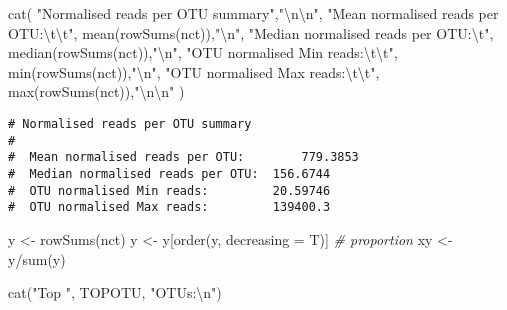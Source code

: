\documentclass[
]{article}
\newenvironment{Shaded}{\begin{snugshade}}{\end{snugshade}}
\newcommand{\AttributeTok}[1]{\textcolor[rgb]{0.77,0.63,0.00}{#1}}
\newcommand{\CommentTok}[1]{\textcolor[rgb]{0.56,0.35,0.01}{\textit{#1}}}
\newcommand{\FunctionTok}[1]{\textcolor[rgb]{0.00,0.00,0.00}{#1}}
\newcommand{\NormalTok}[1]{#1}
\newcommand{\OtherTok}[1]{\textcolor[rgb]{0.56,0.35,0.01}{#1}}
\newcommand{\SpecialCharTok}[1]{\textcolor[rgb]{0.00,0.00,0.00}{#1}}
\newcommand{\StringTok}[1]{\textcolor[rgb]{0.31,0.60,0.02}{#1}}
\begin{document}
\begin{Shaded}
\begin{Highlighting}[]
\FunctionTok{cat}\NormalTok{(}
  \StringTok{"Normalised reads per OTU summary"}\NormalTok{,}\StringTok{"}\SpecialCharTok{\textbackslash{}n\textbackslash{}n}\StringTok{"}\NormalTok{,}
  \StringTok{"Mean normalised reads per OTU:}\SpecialCharTok{\textbackslash{}t\textbackslash{}t}\StringTok{"}\NormalTok{, }\FunctionTok{mean}\NormalTok{(}\FunctionTok{rowSums}\NormalTok{(nct)),}\StringTok{"}\SpecialCharTok{\textbackslash{}n}\StringTok{"}\NormalTok{,}
  \StringTok{"Median normalised reads per OTU:}\SpecialCharTok{\textbackslash{}t}\StringTok{"}\NormalTok{, }\FunctionTok{median}\NormalTok{(}\FunctionTok{rowSums}\NormalTok{(nct)),}\StringTok{"}\SpecialCharTok{\textbackslash{}n}\StringTok{"}\NormalTok{,}
  \StringTok{"OTU normalised Min reads:}\SpecialCharTok{\textbackslash{}t\textbackslash{}t}\StringTok{"}\NormalTok{, }\FunctionTok{min}\NormalTok{(}\FunctionTok{rowSums}\NormalTok{(nct)),}\StringTok{"}\SpecialCharTok{\textbackslash{}n}\StringTok{"}\NormalTok{,}
  \StringTok{"OTU normalised Max reads:}\SpecialCharTok{\textbackslash{}t\textbackslash{}t}\StringTok{"}\NormalTok{, }\FunctionTok{max}\NormalTok{(}\FunctionTok{rowSums}\NormalTok{(nct)),}\StringTok{"}\SpecialCharTok{\textbackslash{}n\textbackslash{}n}\StringTok{"}
\NormalTok{)}
\end{Highlighting}
\end{Shaded}

\begin{verbatim}
# Normalised reads per OTU summary 
# 
#  Mean normalised reads per OTU:        779.3853 
#  Median normalised reads per OTU:  156.6744 
#  OTU normalised Min reads:         20.59746 
#  OTU normalised Max reads:         139400.3
\end{verbatim}

\begin{Shaded}
\begin{Highlighting}[]
\NormalTok{y }\OtherTok{\textless{}{-}} \FunctionTok{rowSums}\NormalTok{(nct)}
\NormalTok{y }\OtherTok{\textless{}{-}}\NormalTok{ y[}\FunctionTok{order}\NormalTok{(y, }\AttributeTok{decreasing =}\NormalTok{ T)]}
\CommentTok{\# proportion}
\NormalTok{xy }\OtherTok{\textless{}{-}}\NormalTok{ y}\SpecialCharTok{/}\FunctionTok{sum}\NormalTok{(y)}

\FunctionTok{cat}\NormalTok{(}\StringTok{"Top "}\NormalTok{, TOPOTU, }\StringTok{"OTUs:}\SpecialCharTok{\textbackslash{}n}\StringTok{"}\NormalTok{)}
\end{Highlighting}
\end{Shaded}
\end{document}
